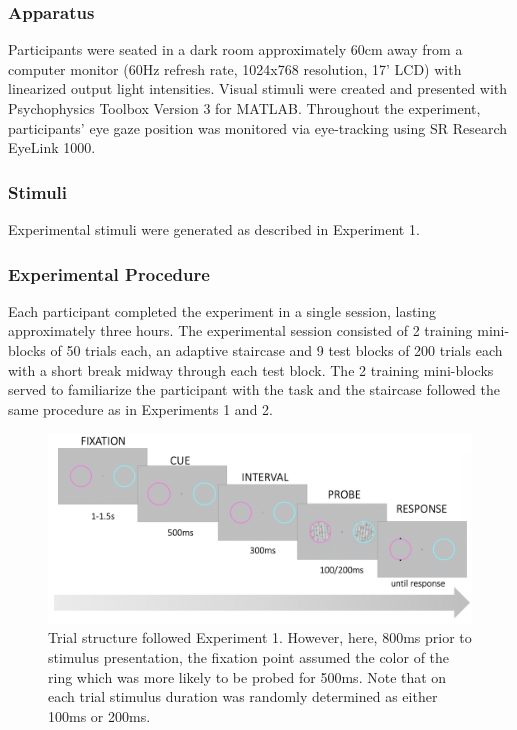 \documentclass[a4paper, nobind]{templates/ociamthesis}
\begin{document}
\hypertarget{apparatus-2}{%
\subsubsection{Apparatus}\label{apparatus-2}}

Participants were seated in a dark room approximately 60cm away from a computer monitor (60Hz refresh rate, 1024x768 resolution, 17' LCD) with linearized output light intensities. Visual stimuli were created and presented with Psychophysics Toolbox Version 3 \autocite[PsychToolbox-3,][]{brainard1997} for MATLAB. Throughout the experiment, participants' eye gaze position was monitored via eye-tracking using SR Research EyeLink 1000.

\hypertarget{stimuli-2}{%
\subsubsection{Stimuli}\label{stimuli-2}}

Experimental stimuli were generated as described in Experiment 1.

\hypertarget{experimental-procedure-2}{%
\subsubsection{Experimental Procedure}\label{experimental-procedure-2}}

Each participant completed the experiment in a single session, lasting approximately three hours. The experimental session consisted of 2 training mini-blocks of 50 trials each, an adaptive staircase and 9 test blocks of 200 trials each with a short break midway through each test block. The 2 training mini-blocks served to familiarize the participant with the task and the staircase followed the same procedure as in Experiments 1 and 2.

\begin{figure}

{\centering \includegraphics[width=1\linewidth]{figures/distr-trial-c} 

}

\caption[Experiment 3, Trial structure]{Trial structure followed Experiment 1. However, here, 800ms prior to stimulus presentation, the fixation point assumed the color of the ring which was more likely to be probed for 500ms. Note that on each trial stimulus duration was randomly determined as either 100ms or 200ms.}\label{fig:distr-trial-c}
\end{figure}
\end{document}
